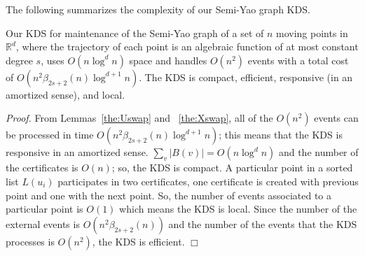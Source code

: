 \documentclass[11pt]{llncs}
\renewenvironment{proof}{\emph{Proof.}}{\hfill $\Box$ \medskip\\}
\begin{document}
The following summarizes the complexity of our Semi-Yao graph KDS.
\begin{theorem}\label{the:KineticSYG}
Our KDS for maintenance of the Semi-Yao graph of a set of $n$ moving points in $\mathbb{R}^d$, where the trajectory of each point is an algebraic function of at most constant degree $s$, uses  $O(n\log^d n)$  space and handles $O(n^2)$ events with a total cost of $O(n^2\beta_{2s+2}(n)\log^{d+1} n)$. The KDS is compact, efficient, responsive (in an amortized sense), and local.
\end{theorem}
\begin{proof}
From Lemmas~\ref{the:Uswap} and ~\ref{the:Xswap}, all of the $O(n^2)$ events can be processed in time $O(n^2\beta_{2s+2}(n)\log^{d+1} n)$; this means that the KDS is responsive in an amortized sense. $\sum_v|B(v)|=O(n\log^d n)$ and the number of the certificates is $O(n)$; so, the KDS is compact. A particular point in a sorted list $L(u_i)$ participates in two certificates, one certificate is created with previous point and one with the next point. So, the number of events associated to a particular point is $O(1)$ which means the KDS is local. Since the number of the external events is $O(n^2\beta_{2s+2}(n))$ and the number of the events that the KDS processes is $O(n^2)$, the KDS is efficient.
\end{proof}
\end{document}

